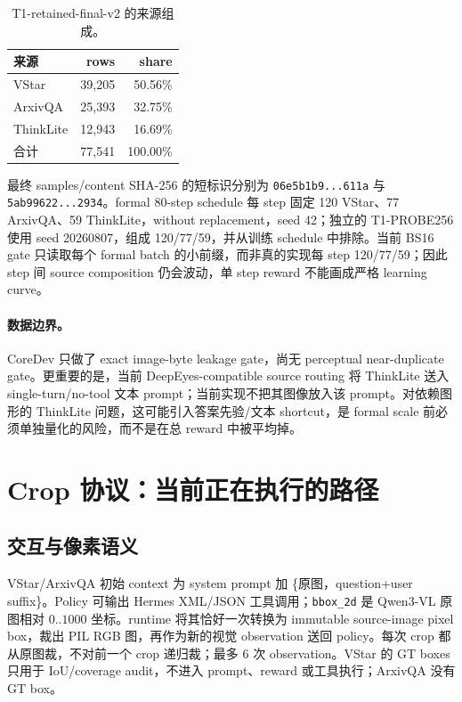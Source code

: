 \documentclass[UTF8,twocolumn,10pt,a4paper]{ctexart}
\newcommand{\code}[1]{\texttt{#1}}
\begin{document}
\begin{table}[t]
\centering
\caption{T1-retained-final-v2 的来源组成。}
\label{tab:data}
\small
\begin{tabular}{lrr}
\toprule
来源 & rows & share \\
\midrule
VStar & 39,205 & 50.56\% \\
ArxivQA & 25,393 & 32.75\% \\
ThinkLite & 12,943 & 16.69\% \\
\midrule
合计 & 77,541 & 100.00\% \\
\bottomrule
\end{tabular}
\end{table}

最终 samples/content SHA-256 的短标识分别为 \code{06e5b1b9...611a} 与 \code{5ab99622...2934}。formal 80-step schedule 每 step 固定 120 VStar、77 ArxivQA、59 ThinkLite，without replacement，seed 42；独立的 T1-PROBE256 使用 seed 20260807，组成 120/77/59，并从训练 schedule 中排除。当前 BS16 gate 只读取每个 formal batch 的小前缀，而非真的实现每 step 120/77/59；因此 step 间 source composition 仍会波动，单 step reward 不能画成严格 learning curve。

\paragraph{数据边界。}
CoreDev 只做了 exact image-byte leakage gate，尚无 perceptual near-duplicate gate。更重要的是，当前 DeepEyes-compatible source routing 将 ThinkLite 送入 single-turn/no-tool 文本 prompt；当前实现不把其图像放入该 prompt。对依赖图形的 ThinkLite 问题，这可能引入答案先验/文本 shortcut，是 formal scale 前必须单独量化的风险，而不是在总 reward 中被平均掉。

\section{Crop 协议：当前正在执行的路径}

\subsection{交互与像素语义}

VStar/ArxivQA 初始 context 为 system prompt 加 \{原图，question+user suffix\}。Policy 可输出 Hermes XML/JSON 工具调用；\code{bbox\_2d} 是 Qwen3-VL 原图相对 $0..1000$ 坐标。runtime 将其恰好一次转换为 immutable source-image pixel box，裁出 PIL RGB 图，再作为新的视觉 observation 送回 policy。每次 crop 都从原图裁，不对前一个 crop 递归裁；最多 6 次 observation。VStar 的 GT boxes 只用于 IoU/coverage audit，不进入 prompt、reward 或工具执行；ArxivQA 没有 GT box。
\end{document}
